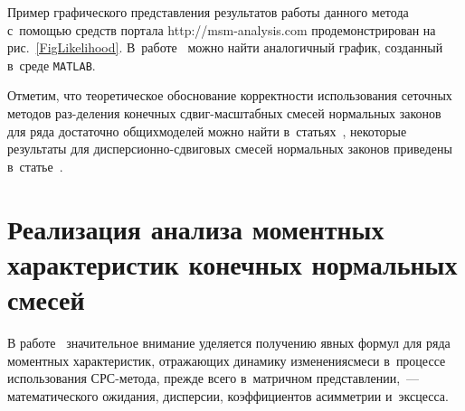 \begin{multicols}{2}
Пример графического представления результатов работы данного метода с~по\-мощью 
средств портала {\sf http://msm-analysis.com} продемонстрирован на 
рис.~\ref{FigLikelihood}. В~работе~\cite{Gorshenin2016CUDA} можно найти 
аналогичный график, созданный в~среде \verb"MATLAB".

Отметим, что теоретическое обоснование корректности использования 
сеточных методов раз-\linebreak деления конечных сдвиг-мас\-штаб\-ных смесей нор\-маль\-ных законов 
для ряда достаточно общих\linebreak моде\-лей можно найти 
в~статьях~\cite{Gorshenin2012aStab,Gorshenin2012bStab}, некоторые результаты 
для дис\-пер\-си\-он\-но-сдви\-го\-вых смесей нормальных законов приведены 
в~статье~\cite{Korolev2015}.

\section{Реализация анализа моментных характеристик конечных нормальных смесей}

В работе~\cite{Gorshenin2016Concept} значительное внимание уделяется 
получению явных формул для ряда моментных характеристик, отражающих 
динамику изменения\linebreak смеси в~процессе использования СРС-ме\-то\-да, преж\-де всего 
в~матричном представлении,~--- математического ожидания, дисперсии, 
коэффициентов асимметрии и~эксцесса.


\end{multicols}
